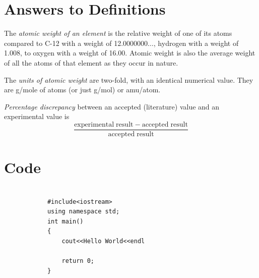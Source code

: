 \documentclass{article}
\begin{document}

\section{Answers to Definitions}

\begin{enumerate}
\begin{item}
The \emph{atomic weight of an element} is the relative weight of one of its atoms compared to C-12 with a weight of 12.0000000$\ldots$, hydrogen with a weight of 1.008, to oxygen with a weight of 16.00. Atomic weight is also the average weight of all the atoms of that element as they occur in nature.
\end{item}
\begin{item}
The \emph{units of atomic weight} are two-fold, with an identical numerical value. They are g/mole of atoms (or just g/mol) or amu/atom.
\end{item}
\begin{item}
\emph{Percentage discrepancy} between an accepted (literature) value and an experimental value is
\begin{equation*}
\frac{\mathrm{experimental\;result} - \mathrm{accepted\;result}}{\mathrm{accepted\;result}}
\end{equation*}
\end{item}
\end{enumerate}







\section{Code}

\begin{verbatim}
    
            #include<iostream>
            using namespace std;
            int main()
            {   
                cout<<Hello World<<endl

                return 0;
            }   

\end{verbatim}
\end{document}
